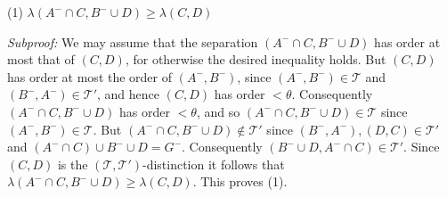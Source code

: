 \hspace*{12pt}(1) $\lambda(A^- \cap C, B^- \cup D) \ge \lambda(C, D)$

\textit{Subproof:} We may assume that the separation $(A^- \cap C, B^- \cup D)$ has order at most that of $(C, D)$, for otherwise the desired inequality holds. But $(C, D)$ has order at most the order of $(A^-, B^-)$, since $(A^-, B^-) \in \mathcal{T}$ and $(B^-, A^-) \in \mathcal{T}'$, and hence $(C, D)$ has order $< \theta$. Consequently $(A^- \cap C, B^- \cup D)$ has order $< \theta$, and so $(A^- \cap C, B^- \cup D) \in \mathcal{T}$ since $(A^-, B^-) \in \mathcal{T}$. But $(A^- \cap C, B^- \cup D) \notin \mathcal{T}'$ since $(B^-, A^-), (D, C) \in \mathcal{T}'$ and $(A^- \cap C) \cup B^- \cup D = G^-$. Consequently $(B^- \cup D, A^- \cap C) \in \mathcal{T}'$. Since $(C, D)$ is the $(\mathcal{T}, \mathcal{T}')$-distinction it follows that $\lambda(A^- \cap C, B^- \cup D) \ge \lambda(C, D)$. This proves (1).
